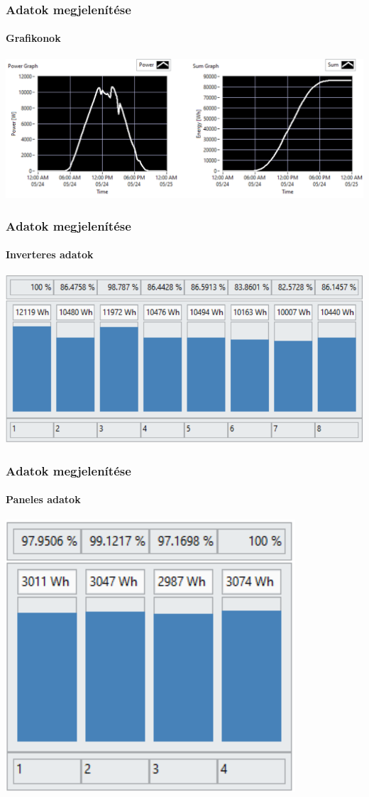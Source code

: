 \documentclass{beamer}
\begin{document}
\begin{frame}
  \frametitle{Αdatok megjelenítése}
  \framesubtitle{Grafikonok}

  \includegraphics[width=\textwidth]{static/windows-graph.png}
\end{frame}

\begin{frame}
  \frametitle{Αdatok megjelenítése}
  \framesubtitle{Inverteres adatok}

  \centering
  \includegraphics[width=\textwidth]{static/windows-inverter-energy.png}
\end{frame}

\begin{frame}
  \frametitle{Αdatok megjelenítése}
  \framesubtitle{Paneles adatok}

  \centering
  \includegraphics[width=.5\textwidth]{static/windows-panel-energy.png}
\end{frame}
\end{document}
